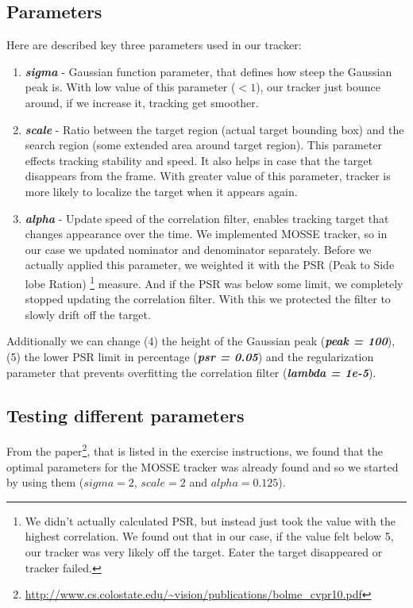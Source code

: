 \documentclass[runningheads]{llncs}
\begin{document}
\subsection{Parameters}
Here are described key three parameters used in our tracker: 
\begin{enumerate}
    \item \textbf{\textit{sigma}} - Gaussian function parameter, that defines how steep the Gaussian peak is. With low value of this parameter ($< 1$), our tracker just bounce around, if we increase it, tracking get smoother.
    \item \textbf{\textit{scale}} - Ratio between the target region (actual target bounding box) and the search region (some extended area around target region). This parameter effects tracking stability and speed. It also helps in case that the target disappears from the frame. With greater value of this parameter, tracker is more likely to localize the target when it appears again.
    \item \textbf{\textit{alpha}} - Update speed of the correlation filter, enables tracking target that changes appearance over the time. We implemented MOSSE tracker, so in our case we updated nominator and denominator separately. Before we actually applied this parameter, we weighted it with the PSR (Peak to Side lobe Ration) \footnote{We didn't actually calculated PSR, but instead just took the value with the highest correlation. We found out that in our case, if the value felt below 5, our tracker was very likely off the target. Eater the target disappeared or tracker failed.} measure. And if the PSR was below some limit, we completely stopped updating the correlation filter. With this we protected the filter to slowly drift off the target.
\end{enumerate}

Additionally we can change (4) the height of the Gaussian peak (\textbf{\textit{peak = 100}}), (5) the lower PSR limit in percentage (\textbf{\textit{psr = 0.05}}) and the regularization parameter that prevents overfitting the correlation filter (\textbf{\textit{lambda = 1e-5}}).

\subsection{Testing different parameters}
From the paper\footnote{\url{http://www.cs.colostate.edu/~vision/publications/bolme_cvpr10.pdf}}, that is listed in the exercise instructions, we found that the optimal parameters for the MOSSE tracker was already found and so we started by using them ($sigma = 2$, $scale = 2$ and $alpha = 0.125$).
\end{document}
